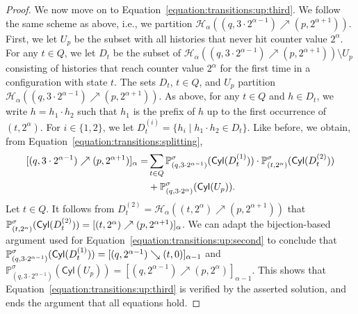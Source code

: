 \documentclass[a4paper,UKenglish,cleveref,autoref,thm-restate,colorlinks]{lipics-v2021}
\newcommand{\proba}{\mathbb{P}}
\newcommand{\cyl}[1]{\mathsf{Cyl}(#1)}
\newcommand{\histPart}{\mathcal{H}}
\newcommand{\hist}{h}
\newcommand{\histConcat}[2]{#1\cdot{}#2}
\newcommand{\ocStateSpace}{Q}
\newcommand{\ocState}{q}
\newcommand{\ocStateB}{p}
\newcommand{\ocStateC}{t}
\newcommand{\powerIndex}{\alpha}
\newcommand{\upProba}[5]{[(#1,#2)\nearrow{}(#3,#4)]_{#5}}
\newcommand{\downProba}[5]{[(#1,#2)\searrow{}(#3,#4)]_{#5}}
\newcommand{\upHistSet}[5]{\histPart_{#5}((#1,#2)\nearrow{}(#3,#4))}
\newcommand{\upPart}[1]{U_{#1}}
\newcommand{\downPart}[1]{D_{#1}}
\newcommand{\stratGeneric}[1]{{\sigma_{#1}}}
\newcommand{\strat}{\stratGeneric{}}
\begin{document}
\begin{proof}
  We now move on to Equation~\eqref{equation:transitions:up:third}.
  We follow the same scheme as above, i.e.,  we partition $\upHistSet{\ocState}{3\cdot 2^{\powerIndex-1}}{\ocStateB}{2^{\powerIndex+1}}{\powerIndex}$.
  First, we let $\upPart{\ocStateB}$ be the subset with all histories that never hit counter value $2^\powerIndex$.
  For any $\ocStateC\in\ocStateSpace$, we let $\downPart{\ocStateC}$ be the subset of $\upHistSet{\ocState}{3\cdot 2^{\powerIndex-1}}{\ocStateB}{2^{\powerIndex+1}}{\powerIndex}\setminus\upPart{\ocStateB}$ consisting of histories that reach counter value $2^\powerIndex$ for the first time in a configuration with state $\ocStateC$.
  The sets $\downPart{\ocStateC}$, $\ocStateC\in\ocStateSpace$, and $\upPart{\ocStateB}$ partition $\upHistSet{\ocState}{3\cdot 2^{\powerIndex-1}}{\ocStateB}{2^{\powerIndex+1}}{\powerIndex}$.
  As above, for any $\ocStateC\in\ocStateSpace$ and $\hist\in\downPart{\ocStateC}$, we write $\hist=\histConcat{\hist_1}{\hist_2}$ such that $\hist_1$ is the prefix of $\hist$ up to the first occurrence of $(\ocStateC, 2^\powerIndex)$.
  For $i\in\{1, 2\}$, we let $\downPart{\ocStateC}^{(i)}= \{\hist_i\mid\histConcat{\hist_1}{\hist_2}\in\downPart{\ocStateC}\}$.
  Like before, we obtain, from Equation~\eqref{equation:transitions:splitting},
  \begin{equation*}
    \begin{aligned}
      \upProba{\ocState}{3\cdot 2^{\powerIndex-1}}{\ocStateB}{2^{\powerIndex+1}}{\powerIndex} =
      &
      \sum_{\ocStateC\in\ocStateSpace}
      \probaG{(\ocState, 3\cdot 2^{\powerIndex-1})}{\strat}(\cyl{\downPart{\ocStateC}^{(1)}})
      \cdot
      \probaG{(\ocStateC,  2^{\powerIndex})}{\strat}(\cyl{\downPart{\ocStateC}^{(2)}})
      \\
      & +
      \probaG{(\ocState, 3\cdot 2^\powerIndex)}{\strat}(\cyl{\upPart{\ocStateB}}).
    \end{aligned}
  \end{equation*}
  Let $\ocStateC\in\ocStateSpace$.
  It follows from $\downPart{\ocStateC}^{(2)} = \upHistSet{\ocStateC}{2^\powerIndex}{\ocStateB}{2^{\powerIndex+1}}{\powerIndex}$ that
  $\probaG{(\ocStateC,  2^{\powerIndex})}{\strat}(\cyl{\downPart{\ocStateC}^{(2)}}) =
  \upProba{\ocStateC}{2^\powerIndex}{\ocStateB}{2^{\powerIndex+1}}{\powerIndex}$.
  We can adapt the bijection-based argument used for Equation~\eqref{equation:transitions:up:second} to conclude that
  $\probaG{(\ocState, 3\cdot 2^{\powerIndex-1})}{\strat}(\cyl{\downPart{\ocStateC}^{(1)}})=
  \downProba{\ocState}{2^{\powerIndex-1}}{\ocStateC}{0}{\powerIndex-1}$ and
  $\proba_{(\ocState, 3\cdot 2^{\powerIndex-1})}^{\strat}(\cyl{\upPart{\ocStateB}})=
  \upProba{\ocState}{2^{\powerIndex-1}}{\ocStateB}{2^{\powerIndex}}{\powerIndex-1}$.
  This shows that Equation~\eqref{equation:transitions:up:third} is verified by the asserted solution, and ends the argument that all equations hold.


\end{proof}
\end{document}
